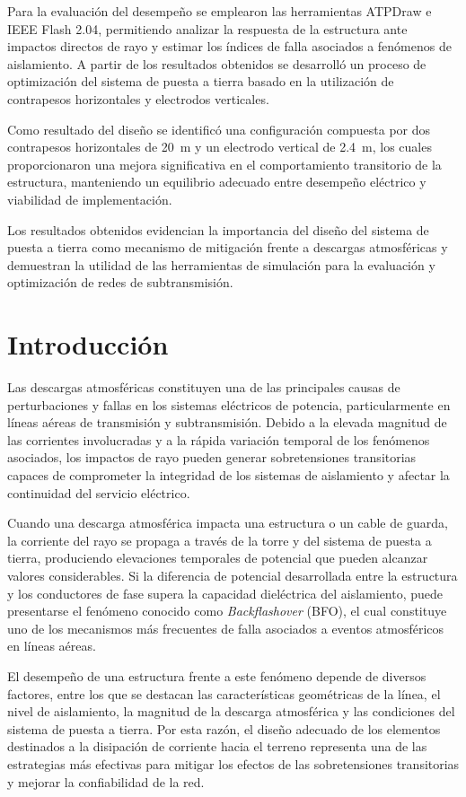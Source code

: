 \documentclass[12pt,letterpaper]{article}
\begin{document}
Para la evaluación del desempeño se emplearon las herramientas ATPDraw e IEEE Flash 2.04, permitiendo analizar la respuesta de la estructura ante impactos directos de rayo y estimar los índices de falla asociados a fenómenos de aislamiento. A partir de los resultados obtenidos se desarrolló un proceso de optimización del sistema de puesta a tierra basado en la utilización de contrapesos horizontales y electrodos verticales.

Como resultado del diseño se identificó una configuración compuesta por dos contrapesos horizontales de \SI{20}{\meter} y un electrodo vertical de \SI{2.4}{\meter}, los cuales proporcionaron una mejora significativa en el comportamiento transitorio de la estructura, manteniendo un equilibrio adecuado entre desempeño eléctrico y viabilidad de implementación.

Los resultados obtenidos evidencian la importancia del diseño del sistema de puesta a tierra como mecanismo de mitigación frente a descargas atmosféricas y demuestran la utilidad de las herramientas de simulación para la evaluación y optimización de redes de subtransmisión.

\section{Introducción}

Las descargas atmosféricas constituyen una de las principales causas de perturbaciones y fallas en los sistemas eléctricos de potencia, particularmente en líneas aéreas de transmisión y subtransmisión. Debido a la elevada magnitud de las corrientes involucradas y a la rápida variación temporal de los fenómenos asociados, los impactos de rayo pueden generar sobretensiones transitorias capaces de comprometer la integridad de los sistemas de aislamiento y afectar la continuidad del servicio eléctrico.

Cuando una descarga atmosférica impacta una estructura o un cable de guarda, la corriente del rayo se propaga a través de la torre y del sistema de puesta a tierra, produciendo elevaciones temporales de potencial que pueden alcanzar valores considerables. Si la diferencia de potencial desarrollada entre la estructura y los conductores de fase supera la capacidad dieléctrica del aislamiento, puede presentarse el fenómeno conocido como \textit{Backflashover} (BFO), el cual constituye uno de los mecanismos más frecuentes de falla asociados a eventos atmosféricos en líneas aéreas.

El desempeño de una estructura frente a este fenómeno depende de diversos factores, entre los que se destacan las características geométricas de la línea, el nivel de aislamiento, la magnitud de la descarga atmosférica y las condiciones del sistema de puesta a tierra. Por esta razón, el diseño adecuado de los elementos destinados a la disipación de corriente hacia el terreno representa una de las estrategias más efectivas para mitigar los efectos de las sobretensiones transitorias y mejorar la confiabilidad de la red.
\end{document}
